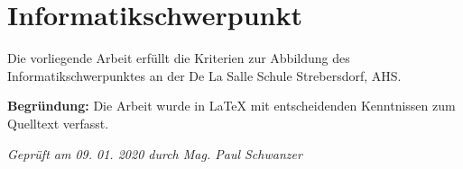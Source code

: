 \documentclass[DLS,
	inreferencehack,
	ohneVgl=false,
	ohneS=false,
	scauthor,
	rundeauslassung=false,
	bookstyle=false,
	widowlines=3,
	titlepage=DLS2017,
	listof=nochaptergap,
	doppelpunkt=false,
	postnotedoppelpunkt=false,
	zitierstil=klassisch]{vwa}
\begin{document}
\vspace{2cm}\noindent

\section*{Informatikschwerpunkt}

Die vorliegende Arbeit erfüllt die Kriterien zur Abbildung des
Informatikschwerpunktes an der De La Salle Schule Strebersdorf, AHS.

\textbf{Begründung:} Die Arbeit wurde in \LaTeX{} mit entscheidenden 
Kenntnissen zum Quelltext verfasst.\vspace{.5\baselineskip}

\noindent\textit{Geprüft am 09. 01. 2020 durch Mag. Paul Schwanzer}
\end{document}
